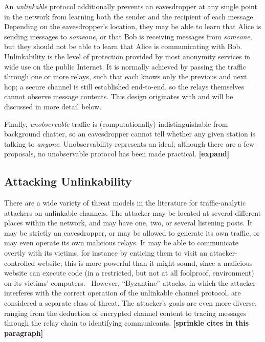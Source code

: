 \documentclass{zarticle}
\def\todo#1{{\color{todocolor}\bfseries [#1]}}
\begin{document}
An \emph{unlinkable} protocol additionally prevents an eavesdropper at
any single point in the network from learning both the sender and the
recipient of each message.  Depending on the eavesdropper's location,
they may be able to learn that Alice is sending messages to
\emph{someone}, or that Bob is receiving messages from \emph{someone},
but they should not be able to learn that Alice is communicating with
Bob.  Unlinkability is the level of protection provided by most
anonymity services in wide use on the public Internet.  It is normally
achieved by passing the traffic through one or more relays, such that
each knows only the previous and next hop; a secure channel is still
established end-to-end, so the relays themselves cannot observe
message contents.  This design originates with \textcite{chaum1981mix}
and will be discussed in more detail below.

Finally, \emph{unobservable} traffic is (computationally)
indistinguishable from background chatter, so an eavesdropper cannot tell
whether any given station is talking to \emph{anyone}.
Unobservability represents an ideal; although there are a few
proposals, no unobservable protocol has been made practical.
\todo{expand}

\subsection{Attacking Unlinkability}

There are a wide variety of threat models in the literature for
traffic-analytic attackers on unlinkable channels.  The attacker may
be located at several different places within the network, and may
have one, two, or several listening posts.  It may be strictly an
eavesdropper, or may be allowed to generate its own traffic, or may
even operate its own malicious relays.  It may be able to communicate
overtly with its victims, for instance by enticing them to visit an
attacker-controlled website; this is more powerful than it might
sound, since a malicious website can execute code (in a restricted,
but not at all foolproof, environment) on its victims'
computers.~\cite{barth2008securing} However, “Byzantine” attacks, in
which the attacker interferes with the correct operation of the
unlinkable channel protocol, are considered a separate class of
threat.  The attacker's goals are even more diverse, ranging from
the deduction of encrypted channel content to tracing messages through
the relay chain to identifying communicants. \todo{sprinkle cites in
  this paragraph}
\end{document}

